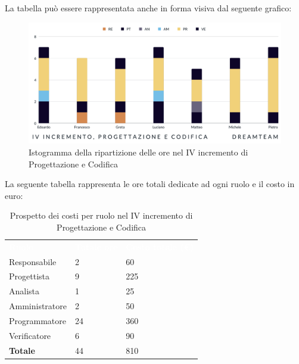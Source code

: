La tabella può essere rappresentata anche in forma visiva dal seguente grafico:
\begin{figure}[H]
\centering
\includegraphics[scale=0.55]{Sezioni/SezioniPreventivo/grafici/Preventivo_progettazione_IV.png}
\caption{Istogramma della ripartizione delle ore nel IV incremento di Progettazione e Codifica}
\end{figure}

La seguente tabella rappresenta le ore totali dedicate ad ogni ruolo e il costo in euro:

\begin{table}[H]
\begin{center}
\renewcommand{\arraystretch}{1.5}
\begin{tabular}{ m{}<{\centering}  m{}<{\centering} m{}<{\centering}}
	\rowcolor{darkblue}
	\textcolor{white}{\textbf{Ruolo}}&\textcolor{white}{\textbf{Totale ore}}&\textcolor{white}{\textbf{Costo totale (\euro)}}\\ 

	Responsabile  & 2 & 60 \\	
	
	Progettista & 9 & 225 \\
	
	Analista & 1 & 25 \\

	Amministratore & 2 & 50 \\
	
	Programmatore & 24 & 360 \\
	
	Verificatore & 6 & 90 \\
	
	\textbf{Totale} & 44 & 810 \\
	
\end{tabular}
\caption{Prospetto dei costi per ruolo nel IV incremento di Progettazione e Codifica}
\end{center}
\end{table}


